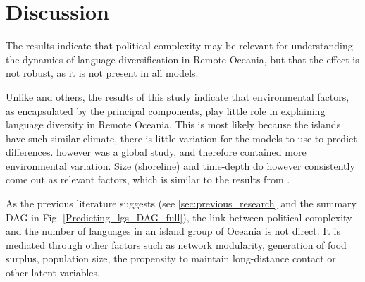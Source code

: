 \documentclass[unnumsec,webpdf,modern,medium]{oup-authoring-template}
\begin{document}






\FloatBarrier
\section{Discussion}
\label{pol_study_discisson}
The results indicate that political complexity may be relevant for understanding the dynamics of language diversification in Remote Oceania, but that the effect is not robust, as it is not present in all models. 

Unlike \citet{hua2019ecological} and others, the results of this study indicate that environmental factors, as encapsulated by the principal components, play little role in explaining language diversity in Remote Oceania. This is most likely because the islands have such similar climate, there is little variation for the models to use to predict differences. \citet{hua2019ecological} however was a global study, and therefore contained more environmental variation. Size (shoreline) and time-depth do however consistently come out as relevant factors, which is similar to the results from \citet{gavin2012island}.

As the previous literature suggests (see \ref{sec:previous_research} and the summary DAG in Fig. \ref{Predicting_lgs_DAG_full}), the link between political complexity and the number of languages in an island group of Oceania is not direct. It is mediated through other factors such as network modularity, generation of food surplus, population size, the propensity to maintain long-distance contact or other latent variables.
\end{document}
